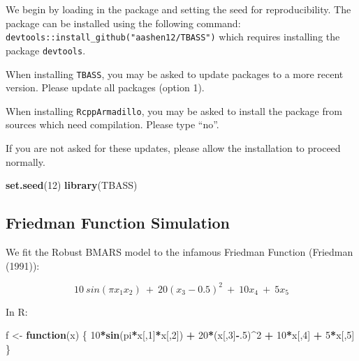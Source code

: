 \documentclass[
]{article}
\newenvironment{Shaded}{\begin{snugshade}}{\end{snugshade}}
\newcommand{\ControlFlowTok}[1]{\textcolor[rgb]{0.13,0.29,0.53}{\textbf{#1}}}
\newcommand{\DecValTok}[1]{\textcolor[rgb]{0.00,0.00,0.81}{#1}}
\newcommand{\KeywordTok}[1]{\textcolor[rgb]{0.13,0.29,0.53}{\textbf{#1}}}
\newcommand{\NormalTok}[1]{#1}
\newcommand{\OperatorTok}[1]{\textcolor[rgb]{0.81,0.36,0.00}{\textbf{#1}}}
\newcommand{\StringTok}[1]{\textcolor[rgb]{0.31,0.60,0.02}{#1}}
\begin{document}
We begin by loading in the package and setting the seed for
reproducibility. The package can be installed using the following
command: \texttt{devtools::install\_github("aashen12/TBASS")} which
requires installing the package \texttt{devtools}.\newline

When installing \texttt{TBASS}, you may be asked to update packages to a
more recent version. Please update all packages (option 1).

When installing \texttt{RcppArmadillo}, you may be asked to install the
package from sources which need compilation. Please type ``no''.

If you are not asked for these updates, please allow the installation to
proceed normally.\newline

\begin{Shaded}
\begin{Highlighting}[]
\KeywordTok{set.seed}\NormalTok{(}\DecValTok{12}\NormalTok{)}
\KeywordTok{library}\NormalTok{(TBASS)}
\end{Highlighting}
\end{Shaded}

\hypertarget{friedman-function-simulation}{%
\subsection{Friedman Function
Simulation}\label{friedman-function-simulation}}

We fit the Robust BMARS model to the infamous Friedman Function
(Friedman (1991)):

\begin{equation}
\label{fried}
10 ~sin(  \pi x_1 x_2) ~+~ 20(x_3 - 0.5)^2 ~+~ 10x_4 ~+~ 5x_5 
\end{equation}

In R:\newline

\begin{Shaded}
\begin{Highlighting}[]
\NormalTok{f <-}\StringTok{ }\ControlFlowTok{function}\NormalTok{(x) \{}
  \DecValTok{10}\OperatorTok{*}\KeywordTok{sin}\NormalTok{(pi}\OperatorTok{*}\NormalTok{x[,}\DecValTok{1}\NormalTok{]}\OperatorTok{*}\NormalTok{x[,}\DecValTok{2}\NormalTok{]) }\OperatorTok{+}\StringTok{ }\DecValTok{20}\OperatorTok{*}\NormalTok{(x[,}\DecValTok{3}\NormalTok{]}\OperatorTok{-}\NormalTok{.}\DecValTok{5}\NormalTok{)}\OperatorTok{^}\DecValTok{2} \OperatorTok{+}\StringTok{ }\DecValTok{10}\OperatorTok{*}\NormalTok{x[,}\DecValTok{4}\NormalTok{] }\OperatorTok{+}\StringTok{ }\DecValTok{5}\OperatorTok{*}\NormalTok{x[,}\DecValTok{5}\NormalTok{]}
\NormalTok{\} }
\end{Highlighting}
\end{Shaded}
\end{document}
